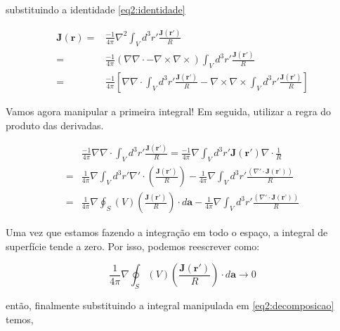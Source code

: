 substituindo a identidade \ref{eq2:identidade}

\begin{equation}
	\begin{split}
		\textbf{J}(\textbf{r}) = & \frac{-1}{4\pi}\nabla^2\int_V d^3r'  \frac{\textbf{J}(\textbf{r}')}{R} \\ 
		= & \frac{-1}{4\pi}\left( \nabla \nabla \cdot- \nabla \times \nabla \times \right)\int_V d^3r'\frac{\textbf{J}(\textbf{r}')}{R} \\
		= & \frac{-1}{4\pi} \left[\nabla \nabla \cdot \int_V d^3r'\frac{\textbf{J}(\textbf{r}')}{R} - \nabla \times \nabla \times \int_V d^3r'\frac{\textbf{J}(\textbf{r}')}{R} \right]
	\end{split}
\end{equation}

Vamos agora manipular a primeira integral! Em seguida, utilizar a regra do produto das derivadas.

\begin{equation*}
	\begin{split}
		& \frac{-1}{4\pi} \nabla \nabla \cdot \int_V d^3r'\frac{\textbf{J}(\textbf{r}')}{R} = \frac{-1}{4\pi} \nabla  \int_V d^3r' \textbf{J}(\textbf{r}')\nabla\cdot\frac{1}{R} \\
		= & \frac{1}{4\pi} \nabla  \int_V d^3r' \nabla' \cdot \left(\frac{\textbf{J}(\textbf{r}')}{R}\right) -\frac{1}{4\pi} \nabla \int_V d^3r'\frac{\left( \nabla' \cdot \textbf{J}(\textbf{r'})\right)}{R} \\
		= & \frac{1}{4\pi} \nabla  \oint_S(V) \left(\frac{\textbf{J}(\textbf{r}')}{R}\right) \cdot d\textbf{a}-\frac{1}{4\pi} \nabla \int_V d^3r'\frac{\left( \nabla' \cdot \textbf{J}(\textbf{r'})\right)}{R}
		\label{eq2:decomposicao}
	\end{split}
\end{equation*}

Uma vez que estamos fazendo a integração em todo o espaço, a integral de superfície tende a zero. Por isso, podemos reescrever como:

\begin{equation*}
	\frac{1}{4\pi} \nabla  \oint_S(V) \left(\frac{\textbf{J}(\textbf{r}')}{R}\right) \cdot d\textbf{a} \rightarrow 0
\end{equation*}

então, finalmente substituindo a integral manipulada em \ref{eq2:decomposicao} temos,

